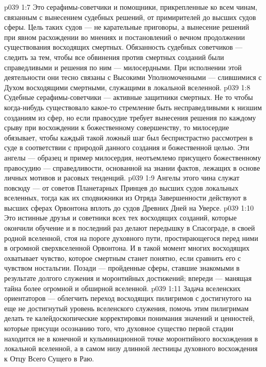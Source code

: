 \vs p039 1:7 \bibnobreakspace {} Это серафимы\hyp{}советчики и помощники, прикрепленные ко всем чинам, связанным с вынесением судебных решений, от примирителей до высших судов сферы. Цель таких судов --- не карательные приговоры, а вынесение решений при явном расхождении во мнениях и постановлений о вечном продолжении существования восходящих смертных. Обязанность судебных советчиков --- следить за тем, чтобы все обвинения против смертных созданий были справедливыми и решения по ним --- милосердными. При исполнении этой деятельности они тесно связаны с Высокими Уполномоченными --- слившимися с Духом восходящими смертными, служащими в локальной вселенной.
\vs p039 1:8 Судебные серафимы\hyp{}советчики --- активные защитники смертных. Не то чтобы когда\hyp{}нибудь существовало какое\hyp{}то стремление быть несправедливыми к низшим созданиям из сфер, но если правосудие требует вынесения решения по каждому срыву при восхождении к божественному совершенству, то милосердие обязывает, чтобы каждый такой ложный шаг был беспристрастно рассмотрен в суде в соответствии с природой данного создания и божественной целью. Эти ангелы --- образец и пример милосердия, неотъемлемо присущего божественному правосудию --- справедливости, основанной на знании фактов, лежащих в основе личных мотивов и расовых тенденций.
\vs p039 1:9 Ангелы этого чина служат повсюду --- от советов Планетарных Принцев до высших судов локальных вселенных, тогда как их сподвижники из Отряда Завершенности действуют в высших сферах Орвонтона вплоть до судов Древних Дней на Уверсе.
\vs p039 1:10 \bibnobreakspace {} Это истинные друзья и советники всех тех восходящих созданий, которые окончили обучение и в последний раз делают передышку в Спасограде, в своей родной вселенной, стоя на пороге духовного пути, простирающегося перед ними в огромной сверхвселенной Орвонтона. И в такой момент многих восходящих охватывает чувство, которое смертным станет понятно, если сравнить его с чувством ностальгии. Позади --- пройденные сферы, ставшие знакомыми в результате долгого служения и моронтийных достижений; впереди --- манящая тайна более огромной и обширной вселенной.
\vs p039 1:11 Задача вселенских ориентаторов --- облегчить переход восходящих пилигримов с достигнутого на еще не достигнутый уровень вселенского служения, помочь этим пилигримам делать те калейдоскопические корректировки понимания значений и ценностей, которые присущи осознанию того, что духовное существо первой стадии находится не в конечной и кульминационной точке моронтийного восхождения в локальной вселенной, а в самом низу длинной лестницы духовного восхождения к Отцу Всего Сущего в Раю.
